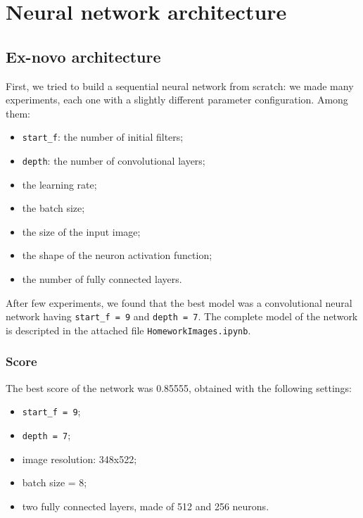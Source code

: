 \documentclass[12pt,a4paper]{report}
\begin{document}

	\chapter{Neural network architecture}
		\section{Ex-novo architecture}
	First, we tried to build a sequential neural network from scratch: we made many experiments, each one with a slightly different parameter configuration. Among them:
			\begin{itemize}
				\item \texttt{start\_f}: the number of initial filters;
				\item \texttt{depth}: the number of convolutional layers;
				\item the learning rate;
				\item the batch size;
				\item the size of the input image;
				\item the shape of the neuron activation function;	
				\item the number of fully connected layers.
			\end{itemize}
	After few experiments, we found that the best model was a convolutional neural network having \texttt{start\_f = 9} and \texttt{depth = 7}. The complete model of the network is descripted in the attached file \texttt{HomeworkImages.ipynb}.
		\subsection{Score}
	The best score of the network was 0.85555, obtained with the following settings:
	\begin{itemize}
		\item	\texttt{start\_f = 9};
		\item	\texttt{depth = 7};
		\item image resolution: 348x522;
		\item batch size = 8;
		\item two fully connected layers, made of 512 and 256 neurons.
	\end{itemize}
\end{document}
